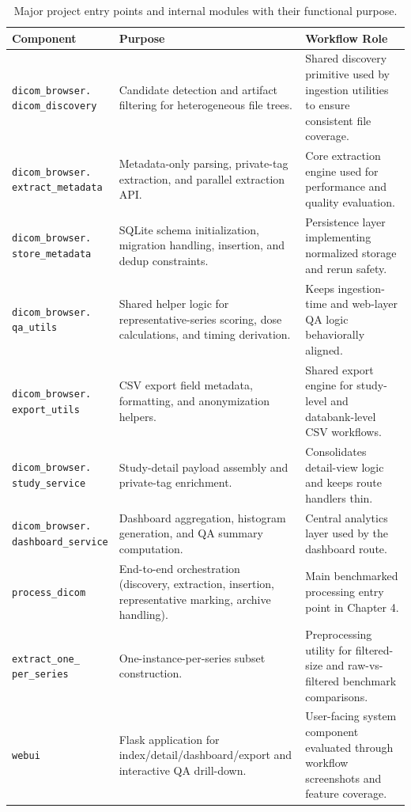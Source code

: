 \begin{table}[htbp]
\centering
\caption{Major project entry points and internal modules with their functional purpose.}
\label{tab:script-matrix}
\small
\begin{tabular}{p{}p{}p{}}
\toprule
Component & Purpose & Workflow Role \\
\midrule
\makecell[l]{\texttt{dicom\_browser.}\\\texttt{dicom\_discovery}} & Candidate detection and artifact filtering for heterogeneous file trees. & Shared discovery primitive used by ingestion utilities to ensure consistent file coverage. \\
\makecell[l]{\texttt{dicom\_browser.}\\\texttt{extract\_metadata}} & Metadata-only parsing, private-tag extraction, and parallel extraction API. & Core extraction engine used for performance and quality evaluation. \\
\makecell[l]{\texttt{dicom\_browser.}\\\texttt{store\_metadata}} & SQLite schema initialization, migration handling, insertion, and dedup constraints. & Persistence layer implementing normalized storage and rerun safety. \\
\makecell[l]{\texttt{dicom\_browser.}\\\texttt{qa\_utils}} & Shared helper logic for representative-series scoring, dose calculations, and timing derivation. & Keeps ingestion-time and web-layer QA logic behaviorally aligned. \\
\makecell[l]{\texttt{dicom\_browser.}\\\texttt{export\_utils}} & CSV export field metadata, formatting, and anonymization helpers. & Shared export engine for study-level and databank-level CSV workflows. \\
\makecell[l]{\texttt{dicom\_browser.}\\\texttt{study\_service}} & Study-detail payload assembly and private-tag enrichment. & Consolidates detail-view logic and keeps route handlers thin. \\
\makecell[l]{\texttt{dicom\_browser.}\\\texttt{dashboard\_service}} & Dashboard aggregation, histogram generation, and QA summary computation. & Central analytics layer used by the dashboard route. \\
\texttt{process\_dicom} & End-to-end orchestration (discovery, extraction, insertion, representative marking, archive handling). & Main benchmarked processing entry point in Chapter 4. \\
\makecell[l]{\texttt{extract\_one\_}\\\texttt{per\_series}} & One-instance-per-series subset construction. & Preprocessing utility for filtered-size and raw-vs-filtered benchmark comparisons. \\
\texttt{webui} & Flask application for index/detail/dashboard/export and interactive QA drill-down. & User-facing system component evaluated through workflow screenshots and feature coverage. \\
\bottomrule
\end{tabular}
\end{table}

